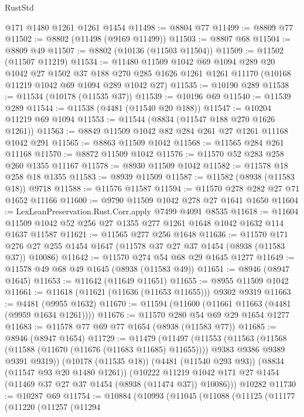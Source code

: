 \begin{lexlean}{RustStd}
\begin{coremodule}
    @171
    @1480
    @1261
    @1261
    @1454
@11498 := @8804 @77
@11499 := @8809 @77
@11502 := @8802 (@11498 (@9169 @11499))
@11503 := @8807 @68
@11504 := @8809 @49
@11507 := @8802 (@10136 (@11503 @11504))
@11509 := @11502 (@11507 @11219)
@11534 := @11480
    @11509
    @1042
    @69
    @1094
    @289
    @20
    @1042
    @27
    @1502
    @37
    @188
    @270
    @285
    @1626
    @1261
    @1261
    @11170
    (@10168 @11219 @1042 @69 @1094 @289 @1042 @27)
@11535 := @10190 @289
@11538 := @11534 (@10178 (@11535 @37))
@11539 := @10196 @69
@11540 := @11539 @289
@11544 := @11538 (@4481 (@11540 @20 @188))
@11547 := @10204 @11219 @69 @1094
@11553 := @11544 (@8834 (@11547 @188 @270 @1626 @1261))
@11563 := @8849 @11509 @1042 @82 @284 @261 @27 @1261 @11168 @1042 @291
@11565 := @8863 @11509 @1042
@11568 := @11565 @284 @261 @11168
@11570 := @8872 @11509 @1042
@11576 := @11570 @52 @283 @258 @260 @1355 @11167
@11578 := @8930 @11509 @1042
@11582 := @11578 @18 @258 @18 @1355
@11583 := @8939 @11509
@11587 := @11582 (@8938 (@11583 @18)) @9718
@11588 := @11576 @11587
@11594 := @11570 @278 @282 @27 @71 @1652 @11166
@11600 := @9790 @11509 @1042 @278 @27 @1641 @1650
@11604 := LexLeanPreservation.Rust.Corr.apply @7499 @4091 @8535
@11618 := @11604 @11509 @1042 @52 @256 @27 @1355 @277 @1261 @1648 @1042 @1632 @114 @1637 @11587
@11621 := @11565 @277 @256 @1648
@11636 := @11570
    @171
    @276
    @27
    @255
    @1454
    @1647
    (@11578 @37 @27 @37 @1454 (@8938 (@11583 @37)) @10086)
@11642 := @11570 @274 @54 @68 @29 @1645 @1277
@11649 := @11578 @49 @68 @49 @1645 (@8938 (@11583 @49))
@11651 := @8946 (@8947 @1645)
@11653 := @11642 (@11649 @11651)
@11655 := @8955 @11509 @1042
@11661 := @11618 (@11621 (@11636 (@11653 @11655))) @9302 @9319
@11663 := @4481 (@9955 @1632)
@11670 := @11594 (@11600 (@11661 @11663 (@4481 (@9959 @1634 @1261))))
@11676 := @11570 @280 @54 @69 @29 @1654 @1277
@11683 := @11578 @77 @69 @77 @1654 (@8938 (@11583 @77))
@11685 := @8946 (@8947 @1654)
@11729 := @11479
    (@11497
      (@11553
        (@11563
          (@11568 (@11588 (@11670 (@11676 (@11683 @11685) @11655))))
          @9383
          @9386
          @9389
          @9391
          @9319))
      (@10178 (@11535 @18))
      (@4481 (@11540 @293 @93))
      (@8834 (@11547 @93 @20 @1480 @1261))
      (@10222 @11219 @1042 @171 @27 @1454 (@11469 @37 @27 @37 @1454 (@8938 (@11474 @37)) @10086)))
    @10282
@11730 := @10287 @69
@11754 := @10884
    (@10993
      (@11045
        (@11088
          (@11125
            (@11177
              (@11220
                (@11257
                  (@11294

\end{coremodule}
\end{lexlean}
